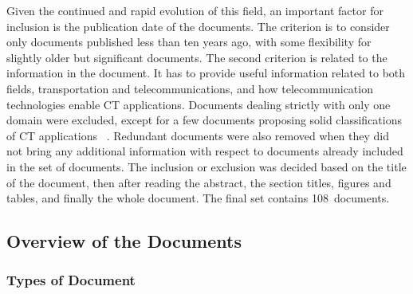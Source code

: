 Given the continued and rapid evolution of this field, an important factor for inclusion is the publication date of the documents. The criterion is to consider only documents published less than ten years ago, with some flexibility for slightly older but significant documents.
The second criterion is related to the information in the document. It has to provide useful information related to both fields, transportation and telecommunications, and how telecommunication technologies enable \acrshort{CT} applications. Documents dealing strictly with only one domain were excluded, except for a few documents proposing solid classifications of \acrshort{CT} applications~ \cite{cvria_applications_2016}. 
Redundant documents were also removed when they did not bring any additional information with respect to documents already included in the set of documents. 
The inclusion or exclusion was decided based on the title of the document, then after reading the abstract, the section titles, figures and tables, and finally the whole document. The final set contains 108~documents. 

\subsection{Overview of the Documents}

\subsubsection{Types of Document}

